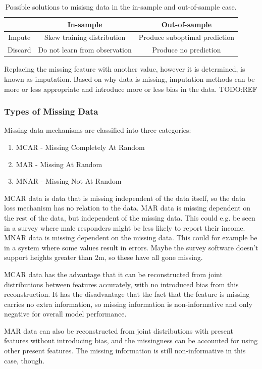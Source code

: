 \begin{table}
  \begin{tabular}{c|cc}
    & In-sample & Out-of-sample \\
    \hline
    Impute & Skew training distribution & Produce suboptimal prediction \\
    Discard & Do not learn from observation & Produce no prediction
  \end{tabular}
  \caption{Possible solutions to misisng data in the in-sample and out-of-sample case.}
  \label{tab:imputation}
\end{table}

Replacing the missing feature with another value, however it is determined, is
known as imputation. Based on why data is missing, imputation methods can be
more or less appropriate and introduce more or less bias in the data. TODO:REF

\subsubsection{Types of Missing Data}

Missing data mechanisms are classified into three categories:
\begin{enumerate}
  \item MCAR - Missing Completely At Random
  \item MAR - Missing At Random
  \item MNAR - Missing Not At Random
\end{enumerate}

MCAR data is data that is missing independent of the data itself, so the data
loss mechanism has no relation to the data. MAR data is missing dependent on
the rest of the data, but independent of the missing data. This could e.g. be
seen in a survey where male responders might be less likely to report their
income. MNAR data is missing dependent on the missing data. This could for
example be in a system where some values result in errors. Maybe the survey
software doesn't support heights greater than 2m, so these have all gone
missing.

MCAR data has the advantage that it can be reconstructed from joint
distributions between features accurately, with no introduced bias from this
reconstruction. It has the disadvantage that the fact that the feature is
missing carries no extra information, so missing information is non-informative
and only negative for overall model performance.

MAR data can also be reconstructed from joint distributions with present
features without introducing bias, and the missingness can be accounted for
using other present features. The missing information is still non-informative
in this case, though.

